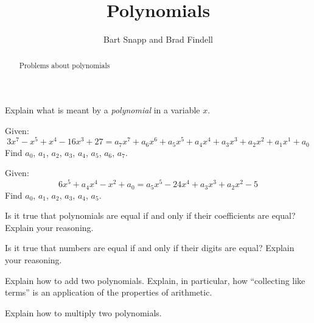 \documentclass[nooutcomes]{ximera}
\title{Polynomials}
\author{Bart Snapp and Brad Findell}
\begin{document}
\begin{abstract}
Problems about polynomials 
\end{abstract}
\maketitle

\begin{problem}Explain what is meant by a \textit{polynomial} in a variable $x$.
\end{problem} 

\begin{problem}Given:
\[
3x^7 -x^5 + x^4 -16x^3 + 27 = a_7 x^7 + a_6x^6 + a_5x^5 + a_4x^4 + a_3x^3 + a_2x^2 + a_1x^1 + a_0
\]
Find $a_0$, $a_1$, $a_2$, $a_3$, $a_4$, $a_5$, $a_6$, $a_7$.
\end{problem} 

\begin{problem}Given:
\[
6x^5+a_4 x^4 -x^2 + a_0 = a_5 x^5 - 24 x^4 + a_3 x^3 + a_2 x^2 - 5
\]
Find $a_0$, $a_1$, $a_2$, $a_3$, $a_4$, $a_5$.
\end{problem} 

\begin{problem}Is it true that polynomials are equal if and only if their
  coefficients are equal? Explain your reasoning.
\end{problem} 

\begin{problem}Is it true that numbers are equal if and only if their digits
  are equal? Explain your reasoning.
\end{problem} 

\begin{problem}Explain how to add two polynomials.  Explain, in particular, how ``collecting like terms'' is
an application of the properties of arithmetic.  
\end{problem} 

\begin{problem}Explain how to multiply two polynomials.
\end{problem} 
\end{document}
